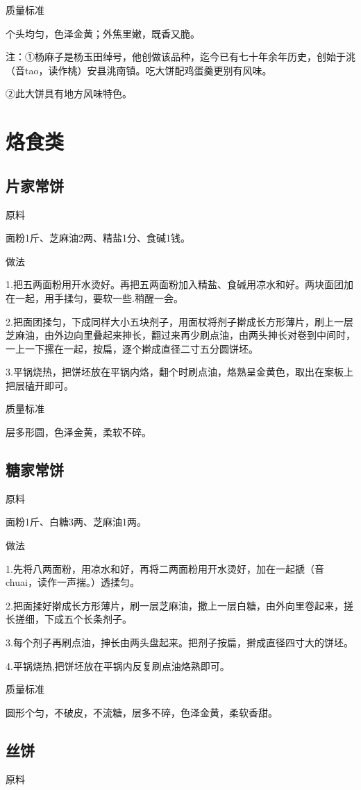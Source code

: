 \documentclass{ctexbook}
\begin{document}
质量标准

个头均匀，色泽金黄；外焦里嫩，既香又脆。

注：①杨麻子是杨玉田绰号，他创做该品种，迄今已有七十年余年历史，创始于洮（音tao，读作桃）安县洮南镇。吃大饼配鸡蛋羹更别有风味。

②此大饼具有地方风味特色。
\section{烙食类}
\subsection{片家常饼}
原料

面粉1斤、芝麻油2两、精盐1分、食碱1钱。

做法

1.把五两面粉用开水烫好。再把五两面粉加入精盐、食碱用凉水和好。两块面团加在一起，用手揉匀，要软一些.稍醒一会。

2.把面团揉匀，下成同样大小五块剂子，用面杖将剂子擀成长方形薄片，刷上一层芝麻油，由外边向里叠起来抻长，翻过来再少刷点油，由两头抻长对卷到中间时，一上一下摞在一起，按扁，逐个擀成直径二寸五分圆饼坯。

3.平锅烧热，把饼坯放在平锅内烙，翻个时刷点油，烙熟呈金黄色，取出在案板上把层磕开即可。

质量标准

层多形圆，色泽金黄，柔软不碎。
\subsection{糖家常饼}
原料

面粉1斤、白糖3两、芝麻油1两。

做法

1.先将八两面粉，用凉水和好，再将二两面粉用开水烫好，加在一起搋（音chuai，读作一声揣。）透揉匀。

2.把面揉好擀成长方形薄片，刷一层芝麻油，撒上一层白糖，由外向里卷起来，搓长搓细，下成五个长条剂子。

3.每个剂子再刷点油，抻长由两头盘起来。把剂子按扁，擀成直径四寸大的饼坯。

4.平锅烧热,把饼坯放在平锅内反复刷点油烙熟即可。

质量标准

圆形个匀，不破皮，不流糖，层多不碎，色泽金黄，柔软香甜。
\subsection{丝饼}
原料
\end{document}
